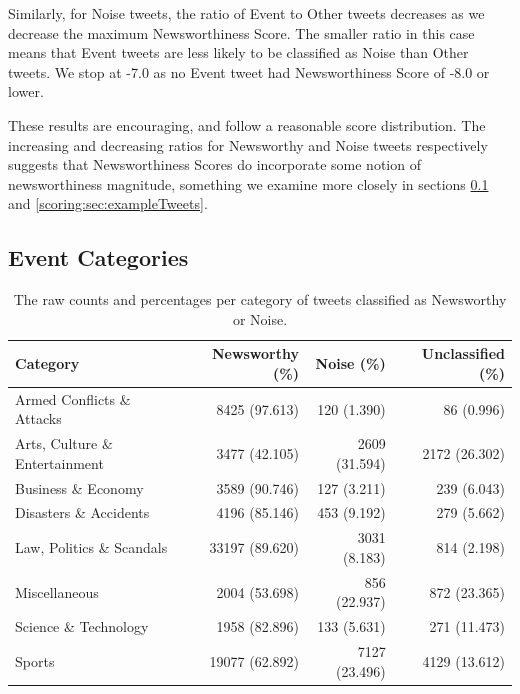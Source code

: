 Similarly, for Noise tweets, the ratio of Event to Other tweets decreases as we decrease the maximum Newsworthiness Score.
The smaller ratio in this case means that Event tweets are less likely to be classified as Noise than Other tweets.
We stop at -7.0 as no Event tweet had Newsworthiness Score of -8.0 or lower.

These results are encouraging, and follow a reasonable score distribution. The increasing and decreasing ratios for Newsworthy and Noise tweets respectively suggests that Newsworthiness Scores do incorporate some notion of newsworthiness magnitude, something we examine more closely in sections \ref{scoring:sec:categories} and \ref{scoring:sec:exampleTweets}.


\subsection{Event Categories}
\label{scoring:sec:categories}

\begin{table}[b!]
	\centering
	\caption{The raw counts and percentages per category of tweets classified as Newsworthy or Noise.}

	\small
	\begin{tabulary}{\textwidth}{l r r r}
		\toprule
		\textbf{Category} & \textbf{Newsworthy (\%)} & \textbf{Noise (\%)} & \textbf{Unclassified (\%)} \\
		\midrule
		Armed Conflicts \& Attacks 			& 8425 (97.613)  & 120 (1.390)   & 86 (0.996) \\
		Arts, Culture \& Entertainment	& 3477 (42.105)  & 2609 (31.594) & 2172 (26.302) \\
		Business \& Economy 						& 3589 (90.746)  & 127 (3.211)   & 239 (6.043) \\
		Disasters \& Accidents 					& 4196 (85.146)  & 453 (9.192)   & 279 (5.662) \\
		Law, Politics \& Scandals 			& 33197 (89.620) & 3031 (8.183)  & 814 (2.198) \\
		Miscellaneous 									& 2004 (53.698)  & 856 (22.937)  & 872 (23.365) \\
		Science \& Technology 					& 1958 (82.896)  & 133 (5.631)   & 271 (11.473) \\
		Sports 													& 19077 (62.892) & 7127 (23.496) & 4129 (13.612) \\
		\bottomrule
		\end{tabulary}
	\label{scoring:table:categories}
\end{table}

